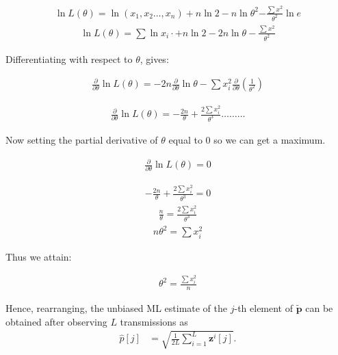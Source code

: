 \documentclass{article}
\begin{document}
\begin{align}
    \ln{L(\theta)}= \ln{(x_{1},x_{2}\dots,x_{n})} + n\ln{2} - n\ln\theta^2 {-\frac{\sum{x^2}}{\theta^2}}\ln{e}
\end{align}
\begin{align}
    \ln{L(\theta)}= \sum\ln{x_{i}} \cdot + n\ln{2} - 2n\ln{\theta} -\frac{\sum{x^2}}{\theta^2}
\end{align}

Differentiating with respect to $\theta$, gives:

\begin{align}
    \frac{\partial }{\partial \theta}\ln L{(\theta)} = -2n\frac{\partial}{\partial\theta}\ln\theta - \sum x_{i}^2\frac{\partial}{\partial\theta}(\frac{1}{\theta^2})
\end{align}

\begin{align}
    \frac{\partial }{\partial \theta}\ln L{(\theta)} = -\frac{2n}{\theta} + \frac{2\sum x_{i}^2}{\theta^3} \dots \dots \dots
\end{align}

Now setting the partial derivative of $\theta$ equal to $0$ so we can get a maximum.

\begin{align}
    \frac{\partial }{\partial \theta}\ln L{(\theta)} = 0
\end{align}

\begin{align}
    -\frac{2n}{\theta} + \frac{2\sum x_{i}^2}{\theta^3} = 0
\end{align}
\begin{align}
    \frac{n}{\theta} = \frac{2\sum x_{i}^2}{\theta^3}
\end{align}
\begin{align}
   n\theta^2= \sum x_{i}^2
\end{align}

Thus we attain:

\begin{align}
    \theta^2 = \frac{\sum x_{i}^2}{n}
\end{align}


Hence, rearranging, the unbiased ML estimate of the $j$-th element of $\tilde{\boldsymbol{p}}$ can be obtained after observing $L$ transmissions as
%
\begin{align}
    \hat{p}[j] &= \sqrt{\frac{1}{2L} \sum_{i = 1}^{L}\boldsymbol{z}^i[j]}.\label{eq:empf_h_rand}
\end{align}
\end{document}
